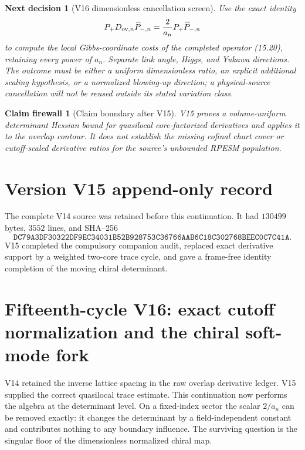 \documentclass[11pt]{article}
\newtheorem{firewall}[theorem]{Claim firewall}
\newtheorem{decision}[theorem]{Next decision}
\theoremstyle{remark}
\begin{document}
\begin{decision}[V16 dimensionless cancellation screen]
\label{dec:v15v15-next}
Use the exact identity
\[
 P_+D_{{\rm ov},n}\widehat P_{-,n}
 =\frac{2}{a_n}P_+\widehat P_{-,n}
\]
to compute the local Gibbs-coordinate costs of the completed
operator (15.20), retaining every power of \(a_n\).  Separate link
angle, Higgs, and Yukawa directions.  The outcome must be either a
uniform dimensionless ratio, an explicit additional scaling
hypothesis, or a normalized blowing-up direction; a physical-source
cancellation will not be reused outside its stated variation class.
\end{decision}

\begin{firewall}[Claim boundary after V15]
\label{fire:v15v15}
V15 proves a volume-uniform determinant Hessian bound for
quasilocal core-factorized derivatives and applies it to the overlap
contour.  It does not establish the missing cofinal chart cover or
cutoff-scaled derivative ratios for the source's unbounded RPESM
population.
\end{firewall}

\section*{Version V15 append-only record}
The complete V14 source was retained before this continuation.  It
had \(130499\) bytes, \(3552\) lines, and SHA--256
\[
 \texttt{DC79A3DF30322DF9EC34031B52B928753C36766AAB6C18C302768BEEC0C7C41A}.
\]
V15 completed the compulsory companion audit, replaced exact
derivative support by a weighted two-core trace cycle, and gave a
frame-free identity completion of the moving chiral determinant.
\section{Fifteenth-cycle V16: exact cutoff normalization and the chiral soft-mode fork}
\label{sec:v15v16}

V14 retained the inverse lattice spacing in the raw overlap
derivative ledger.  V15 supplied the correct quasilocal trace
estimate.  This continuation now performs the algebra at the
determinant level.  On a fixed-index sector the scalar
\(2/a_n\) can be removed exactly: it changes the determinant by a
field-independent constant and contributes nothing to any boundary
influence.  The surviving question is the singular floor of the
dimensionless normalized chiral map.
\end{document}
